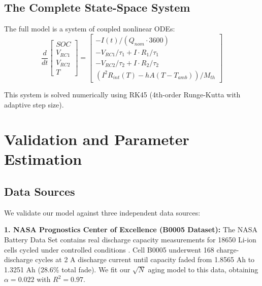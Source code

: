 \documentclass[12pt]{article}
\begin{document}
\subsection{The Complete State-Space System}

The full model is a system of coupled nonlinear ODEs:
\begin{equation}
    \frac{d}{dt}\begin{bmatrix} SOC \\ V_{RC1} \\ V_{RC2} \\ T \end{bmatrix} = 
    \begin{bmatrix}
        -I(t) / (Q_{nom} \cdot 3600) \\
        -V_{RC1}/\tau_1 + I \cdot R_1/\tau_1 \\
        -V_{RC2}/\tau_2 + I \cdot R_2/\tau_2 \\
        (I^2 R_{int}(T) - hA(T - T_{amb})) / M_{th}
    \end{bmatrix}
    \label{eq:state_space}
\end{equation}

This system is solved numerically using RK45 (4th-order Runge-Kutta with adaptive step size).

\section{Validation and Parameter Estimation}

\subsection{Data Sources}

We validate our model against three independent data sources:

\textbf{1. NASA Prognostics Center of Excellence (B0005 Dataset):}
The NASA Battery Data Set contains real discharge capacity measurements for 18650 Li-ion cells cycled under controlled conditions \cite{nasa_battery}. Cell B0005 underwent 168 charge-discharge cycles at 2 A discharge current until capacity faded from 1.8565 Ah to 1.3251 Ah (28.6\% total fade). We fit our $\sqrt{N}$ aging model to this data, obtaining $\alpha = 0.022$ with $R^2 = 0.97$.
\end{document}
